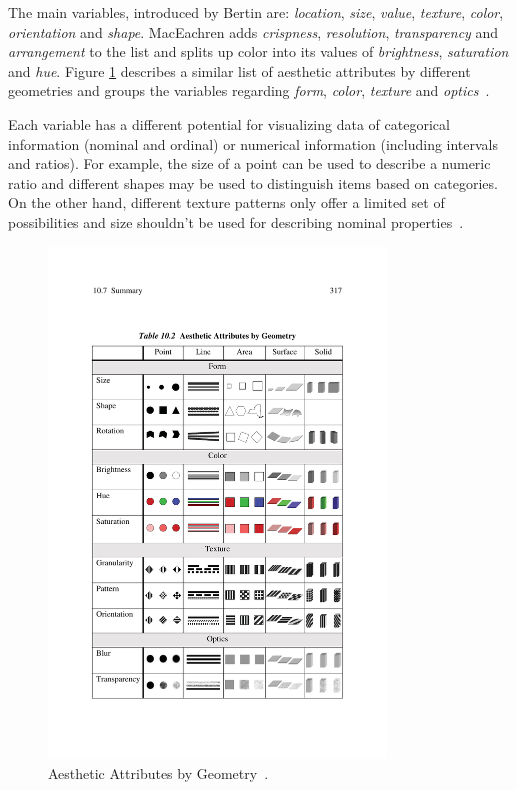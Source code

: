 The main variables, introduced by Bertin are: \textit{location}, \textit{size}, \textit{value}, \textit{texture}, \textit{color}, \textit{orientation} and \textit{shape}. MacEachren adds \textit{crispness}, \textit{resolution}, \textit{transparency} and \textit{arrangement} to the list and splits up color into its values of \textit{brightness}, \textit{saturation} and \textit{hue}. Figure \ref{fig:aesthetic-attributes} describes a similar list of aesthetic attributes by different geometries and groups the variables regarding \textit{form}, \textit{color}, \textit{texture} and \textit{optics}~\cite{Wilkinson05grammar}.

Each variable has a different potential for visualizing data of categorical information (nominal and ordinal) or numerical information (including intervals and ratios). For example, the size of a point can be used to describe a numeric ratio and different shapes may be used to distinguish items based on categories. On the other hand, different texture patterns only offer a limited set of possibilities and size shouldn't be used for describing nominal properties~\cite{noellenburg11geovis, MacEachren95maps}.


 
\begin{figure}[h]
  \begin{center}
    \includegraphics[width=0.8\textwidth]{figures/aesthetic_attributes.pdf}
    \caption{Aesthetic Attributes by Geometry~\cite{Wilkinson05grammar}.}
    \label{fig:aesthetic-attributes}
  \end{center}
\end{figure}


